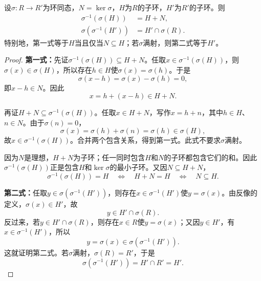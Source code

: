 \begin{lemma}\label{p2:ring-image-preimage}
设$\sigma:R\to R'$为环同态，$N=\ker\sigma$，$H$为$R$的子环，$H'$为$R'$的子环。则
\begin{align*}
\sigma^{-1}(\sigma(H))&=H+N,\\
\sigma(\sigma^{-1}(H'))&=H'\cap\sigma(R).
\end{align*}
特别地，第一式等于$H$当且仅当$N\subseteq H$；若$\sigma$满射，则第二式等于$H'$。
\end{lemma}
\begin{proof}
\textbf{第一式：}先证$\sigma^{-1}(\sigma(H))\subseteq H+N$。任取$x\in\sigma^{-1}(\sigma(H))$，则$\sigma(x)\in\sigma(H)$，所以存在$h\in H$使$\sigma(x)=\sigma(h)$。于是
\[
\sigma(x-h)=\sigma(x)-\sigma(h)=0,
\]
即$x-h\in N$。因此
\[
x=h+(x-h)\in H+N.
\]

再证$H+N\subseteq\sigma^{-1}(\sigma(H))$。任取$x\in H+N$，写作$x=h+n$，其中$h\in H$、$n\in N$。由于$\sigma(n)=0$，
\[
\sigma(x)=\sigma(h)+\sigma(n)=\sigma(h)\in\sigma(H),
\]
故$x\in\sigma^{-1}(\sigma(H))$。合并两个包含关系，得到第一式。此式不要求$\sigma$满射。

因为$N$是理想，$H+N$为子环；任一同时包含$H$和$N$的子环都包含它们的和。因此$\sigma^{-1}(\sigma(H))$正是包含$H$和$\ker\sigma$的最小子环。又因$N\subseteq H+N$，
\[
\sigma^{-1}(\sigma(H))=H
\quad\Longleftrightarrow\quad H+N=H
\quad\Longleftrightarrow\quad N\subseteq H.
\]

\textbf{第二式：}任取$y\in\sigma(\sigma^{-1}(H'))$，则存在$x\in\sigma^{-1}(H')$使$y=\sigma(x)$。由反像的定义，$\sigma(x)\in H'$，故
\[
y\in H'\cap\sigma(R).
\]
反过来，若$y\in H'\cap\sigma(R)$，则存在$x\in R$使$y=\sigma(x)$；又因$y\in H'$，有$x\in\sigma^{-1}(H')$，所以
\[
y=\sigma(x)\in\sigma(\sigma^{-1}(H')).
\]
这就证明第二式。若$\sigma$满射，$\sigma(R)=R'$，于是
\[
\sigma(\sigma^{-1}(H'))=H'\cap R'=H'.
\]
\end{proof}

